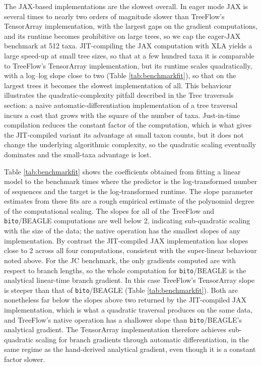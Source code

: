 \documentclass[oupdraft]{sysbio_sse}
\begin{document}
The JAX-based implementations are the slowest overall. In eager mode JAX is several times to nearly two orders of magnitude slower than TreeFlow's TensorArray implementation, with the largest gaps on the gradient computations, and its runtime becomes prohibitive on large trees, so we cap the eager-JAX benchmark at 512 taxa. JIT-compiling the JAX computation with XLA yields a large speed-up at small tree sizes, so that at a few hundred taxa it is comparable to TreeFlow's TensorArray implementation, but its runtime scales quadratically, with a log--log slope close to two (Table \ref{tab:benchmarkfit}), so that on the largest trees it becomes the slowest implementation of all. This behaviour illustrates the quadratic-complexity pitfall described in the Tree traversals section: a naive automatic-differentiation implementation of a tree traversal incurs a cost that grows with the square of the number of taxa. Just-in-time compilation reduces the constant factor of the computation, which is what gives the JIT-compiled variant its advantage at small taxon counts, but it does not change the underlying algorithmic complexity, so the quadratic scaling eventually dominates and the small-taxa advantage is lost.

Table \ref{tab:benchmarkfit} shows the coefficients obtained from fitting a linear model to the benchmark times where the predictor is the log-transformed number of sequences and the target is the log-transformed runtime. The slope parameter estimates from these fits are a rough empirical estimate of the polynomial degree of the computational scaling. The slopes for all of the TreeFlow and \texttt{bito}/BEAGLE computations are well below 2, indicating sub-quadratic scaling with the size of the data; the native operation has the smallest slopes of any implementation. By contrast the JIT-compiled JAX implementation has slopes close to 2 across all four computations, consistent with the super-linear behaviour noted above. For the JC benchmark, the only gradients computed are with respect to branch lengths, so the whole computation for \texttt{bito}/BEAGLE is the analytical linear-time branch gradient. In this case TreeFlow's TensorArray slope is steeper than that of \texttt{bito}/BEAGLE (Table \ref{tab:benchmarkfit}). Both are nonetheless far below the slopes above two returned by the JIT-compiled JAX implementation, which is what a quadratic traversal produces on the same data, and TreeFlow's native operation has a shallower slope than \texttt{bito}/BEAGLE's analytical gradient. The TensorArray implementation therefore achieves sub-quadratic scaling for branch gradients through automatic differentiation, in the same regime as the hand-derived analytical gradient, even though it is a constant factor slower.
\end{document}
